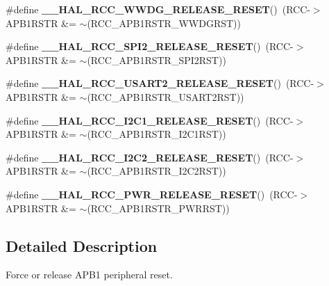 \begin{DoxyCompactItemize}
\item 
\mbox{\label{group___r_c_c___a_p_b1___force___release___reset_ga63fa37b173c2c1d9249389148f96e5f1}} 
\#define {\bfseries \+\_\+\+\_\+\+H\+A\+L\+\_\+\+R\+C\+C\+\_\+\+W\+W\+D\+G\+\_\+\+R\+E\+L\+E\+A\+S\+E\+\_\+\+R\+E\+S\+ET}()~(R\+CC-\/$>$A\+P\+B1\+R\+S\+TR \&= $\sim$(R\+C\+C\+\_\+\+A\+P\+B1\+R\+S\+T\+R\+\_\+\+W\+W\+D\+G\+R\+ST))
\item 
\mbox{\label{group___r_c_c___a_p_b1___force___release___reset_gacb910fd0c3c5a27d020ef3df20fce4c7}} 
\#define {\bfseries \+\_\+\+\_\+\+H\+A\+L\+\_\+\+R\+C\+C\+\_\+\+S\+P\+I2\+\_\+\+R\+E\+L\+E\+A\+S\+E\+\_\+\+R\+E\+S\+ET}()~(R\+CC-\/$>$A\+P\+B1\+R\+S\+TR \&= $\sim$(R\+C\+C\+\_\+\+A\+P\+B1\+R\+S\+T\+R\+\_\+\+S\+P\+I2\+R\+ST))
\item 
\mbox{\label{group___r_c_c___a_p_b1___force___release___reset_ga8baebf28a2739de5f3c5ef72519b9499}} 
\#define {\bfseries \+\_\+\+\_\+\+H\+A\+L\+\_\+\+R\+C\+C\+\_\+\+U\+S\+A\+R\+T2\+\_\+\+R\+E\+L\+E\+A\+S\+E\+\_\+\+R\+E\+S\+ET}()~(R\+CC-\/$>$A\+P\+B1\+R\+S\+TR \&= $\sim$(R\+C\+C\+\_\+\+A\+P\+B1\+R\+S\+T\+R\+\_\+\+U\+S\+A\+R\+T2\+R\+ST))
\item 
\mbox{\label{group___r_c_c___a_p_b1___force___release___reset_ga87cc8c2107c1d0820cc1f7e2aeb1aeb9}} 
\#define {\bfseries \+\_\+\+\_\+\+H\+A\+L\+\_\+\+R\+C\+C\+\_\+\+I2\+C1\+\_\+\+R\+E\+L\+E\+A\+S\+E\+\_\+\+R\+E\+S\+ET}()~(R\+CC-\/$>$A\+P\+B1\+R\+S\+TR \&= $\sim$(R\+C\+C\+\_\+\+A\+P\+B1\+R\+S\+T\+R\+\_\+\+I2\+C1\+R\+ST))
\item 
\mbox{\label{group___r_c_c___a_p_b1___force___release___reset_ga2fa8cc909b285813af86c253ec110356}} 
\#define {\bfseries \+\_\+\+\_\+\+H\+A\+L\+\_\+\+R\+C\+C\+\_\+\+I2\+C2\+\_\+\+R\+E\+L\+E\+A\+S\+E\+\_\+\+R\+E\+S\+ET}()~(R\+CC-\/$>$A\+P\+B1\+R\+S\+TR \&= $\sim$(R\+C\+C\+\_\+\+A\+P\+B1\+R\+S\+T\+R\+\_\+\+I2\+C2\+R\+ST))
\item 
\mbox{\label{group___r_c_c___a_p_b1___force___release___reset_gaaa5a340d38d50e508243f48bbb47dd32}} 
\#define {\bfseries \+\_\+\+\_\+\+H\+A\+L\+\_\+\+R\+C\+C\+\_\+\+P\+W\+R\+\_\+\+R\+E\+L\+E\+A\+S\+E\+\_\+\+R\+E\+S\+ET}()~(R\+CC-\/$>$A\+P\+B1\+R\+S\+TR \&= $\sim$(R\+C\+C\+\_\+\+A\+P\+B1\+R\+S\+T\+R\+\_\+\+P\+W\+R\+R\+ST))
\end{DoxyCompactItemize}


\subsection{Detailed Description}
Force or release A\+P\+B1 peripheral reset. 


